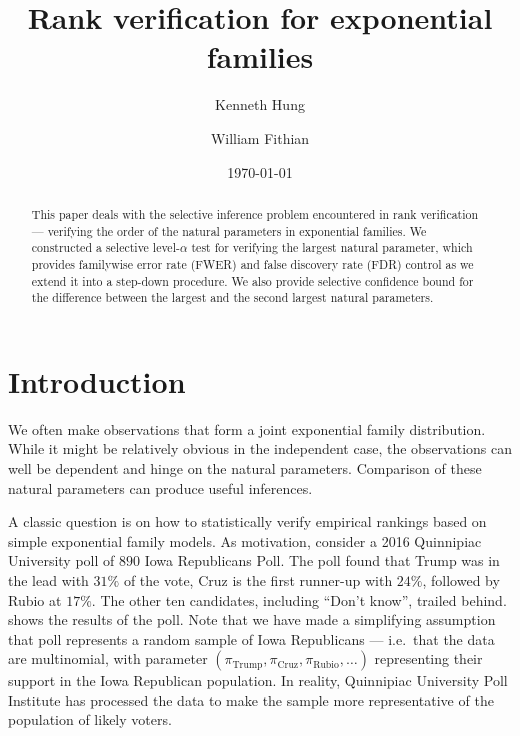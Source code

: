 \documentclass[11pt]{article}
\begin{document}
\title{Rank verification for exponential families}
\author{Kenneth Hung \and William Fithian}
\date{\today}
\maketitle

\begin{abstract}
This paper deals with the selective inference problem encountered in rank verification --- verifying the order of the natural parameters in exponential families. We constructed a selective level-$\alpha$ test for verifying the largest natural parameter, which provides familywise error rate (FWER) and false discovery rate (FDR) control as we extend it into a step-down procedure. We also provide selective confidence bound for the difference between the largest and the second largest natural parameters.
\end{abstract}

\section{Introduction}
\label{sec:introduction}

We often make observations that form a joint exponential family distribution. While it might be relatively obvious in the independent case, the observations can well be dependent and hinge on the natural parameters. Comparison of these natural parameters can produce useful inferences.

A classic question is on how to statistically verify empirical rankings based on simple exponential family models. As motivation, consider a 2016 Quinnipiac University poll of $890$ Iowa Republicans Poll. \cite{quinnipiac} The poll found that Trump was in the lead with $31\%$ of the vote, Cruz is the first runner-up with $24\%$, followed by Rubio at $17\%$. The other ten candidates, including ``Don't know'', trailed behind.  shows the results of the poll. Note that we have made a simplifying assumption that poll represents a random sample of Iowa Republicans --- i.e.\ that the data are multinomial, with parameter $\left(\pi_{\text{Trump}}, \pi_{\text{Cruz}}, \pi_{\text{Rubio}}, \ldots\right)$ representing their support in the Iowa Republican population. In reality, Quinnipiac University Poll Institute has processed the data to make the sample more representative of the population of likely voters.
\end{document}
